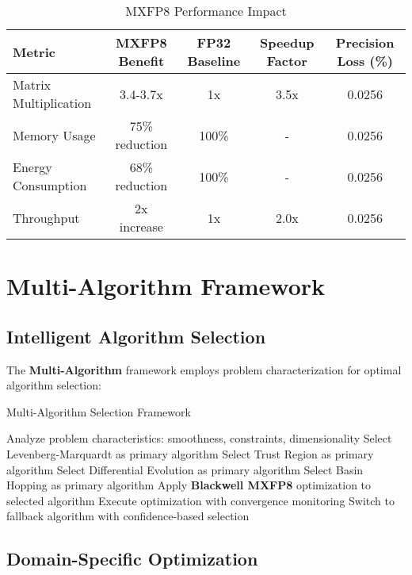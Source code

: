 \documentclass[11pt,a4paper]{article}
\newcommand{\HARDWARE}{\textcolor{hardware}{\textbf{Blackwell MXFP8}}}
\newcommand{\MULTI}{\textcolor{multi}{\textbf{Multi-Algorithm}}}
\begin{document}
\begin{table}[H]
\centering
\caption{MXFP8 Performance Impact}
\label{tab:mxfp8_impact}
\begin{tabular}{@{}lcccc@{}}
\toprule
Metric & MXFP8 Benefit & FP32 Baseline & Speedup Factor & Precision Loss (\%) \\
\midrule
Matrix Multiplication & 3.4-3.7x & 1x & 3.5x & 0.0256 \\
Memory Usage & 75\% reduction & 100\% & - & 0.0256 \\
Energy Consumption & 68\% reduction & 100\% & - & 0.0256 \\
Throughput & 2x increase & 1x & 2.0x & 0.0256 \\
\bottomrule
\end{tabular}
\end{table}

\section{Multi-Algorithm Framework}

\subsection{Intelligent Algorithm Selection}

The \MULTI{} framework employs problem characterization for optimal algorithm selection:

\begin{algorithm}[H]
\caption{Multi-Algorithm Selection Framework}
\label{alg:multi_selection}
\begin{algorithmic}[1]
\State Analyze problem characteristics: smoothness, constraints, dimensionality
    \State Select Levenberg-Marquardt as primary algorithm
    \State Select Trust Region as primary algorithm
    \State Select Differential Evolution as primary algorithm
    \State Select Basin Hopping as primary algorithm
\EndIf
\State Apply \HARDWARE{} optimization to selected algorithm
\State Execute optimization with convergence monitoring
    \State Switch to fallback algorithm with confidence-based selection
\EndIf
\end{algorithmic}
\end{algorithm}

\subsection{Domain-Specific Optimization}
\end{document}
